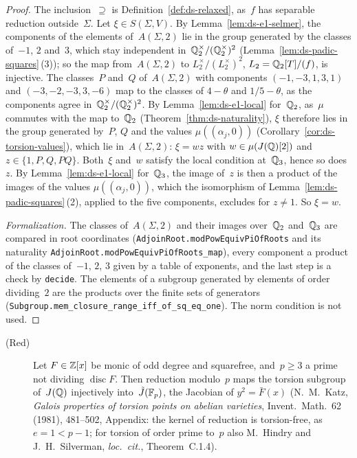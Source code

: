 \begin{proof}
\leanok
{}
The inclusion~$\supseteq$ is Definition~\ref{def:ds-relaxed}, as~$f$ has separable reduction
outside~$\Sigma$. Let $\xi \in S(\Sigma, V)$. By Lemma~\ref{lem:ds-e1-selmer}, the components of
the elements of~$A(\Sigma, 2)$ lie in the group generated by the classes of~$-1$, $2$ and~$3$,
which stay independent in~$\mathbb{Q}_2^\times/(\mathbb{Q}_2^\times)^2$ (Lemma~\ref{lem:ds-padic-squares}\,(3));
so the map from~$A(\Sigma, 2)$ to $L_2^\times/(L_2^\times)^2$, $L_2 = \mathbb{Q}_2[T]/(f)$, is injective.
The classes~$P$ and~$Q$ of~$A(\Sigma, 2)$ with components $(-1, -3, 1, 3, 1)$ and
$(-3, -2, -3, 3, -6)$ map to the classes of $4 - \theta$ and $1/5 - \theta$, as the components
agree in~$\mathbb{Q}_2^\times/(\mathbb{Q}_2^\times)^2$. By Lemma~\ref{lem:ds-e1-local} for~$\mathbb{Q}_2$, as~$\mu$
commutes with the map to~$\mathbb{Q}_2$ (Theorem~\ref{thm:ds-naturality}), $\xi$ therefore lies in the
group generated by~$P$, $Q$ and the values $\mu((\alpha_j, 0))$
(Corollary~\ref{cor:ds-torsion-values}), which lie in~$A(\Sigma, 2)$: $\xi = wz$ with
$w \in \mu(J(\mathbb{Q})[2])$ and $z \in \{1, P, Q, PQ\}$. Both~$\xi$ and~$w$ satisfy the local condition
at~$\mathbb{Q}_3$, hence so does~$z$. By Lemma~\ref{lem:ds-e1-local} for~$\mathbb{Q}_3$, the image of~$z$ is
then a product of the images of the values $\mu((\alpha_j, 0))$, which the isomorphism of
Lemma~\ref{lem:ds-padic-squares}\,(2), applied to the five components, excludes for $z \ne 1$.
So $\xi = w$.

\emph{Formalization.} The classes of~$A(\Sigma, 2)$ and their images over~$\mathbb{Q}_2$ and~$\mathbb{Q}_3$ are
compared in root coordinates (\texttt{AdjoinRoot.modPowEquivPiOfRoots} and its naturality
\texttt{AdjoinRoot.modPowEquivPiOfRoots\_map}), every component a product of the classes of~$-1$,
$2$, $3$ given by a table of exponents, and the last step is a check by \texttt{decide}. The
elements of a subgroup generated by elements of order dividing~$2$ are the products over the finite
sets of generators (\texttt{Subgroup.mem\_closure\_range\_iff\_of\_sq\_eq\_one}). The norm
condition is not used.
\end{proof}

\begin{definition}
\label{def:ds-red}
\leanok
\begin{description}
  \item[\textmd{(Red)}] Let $F \in \mathbb{Z}[x]$ be monic of odd degree and squarefree, and~$p \ge 3$
    a prime not dividing $\operatorname{disc} F$. Then reduction modulo~$p$ maps the torsion
    subgroup of~$J(\mathbb{Q})$ injectively into~$\tilde J(\mathbb{F}_p)$, the Jacobian of $y^2 = \bar F(x)$
    (N.~M.~Katz, \emph{Galois properties of torsion points on abelian varieties}, Invent.\
    Math.~62 (1981), 481--502, Appendix: the kernel of reduction is torsion-free, as
    $e = 1 < p - 1$; for torsion of order prime to~$p$ also M.~Hindry and J.~H.~Silverman,
    \emph{loc.\ cit.}, Theorem~C.1.4).
\end{description}
\end{definition}

